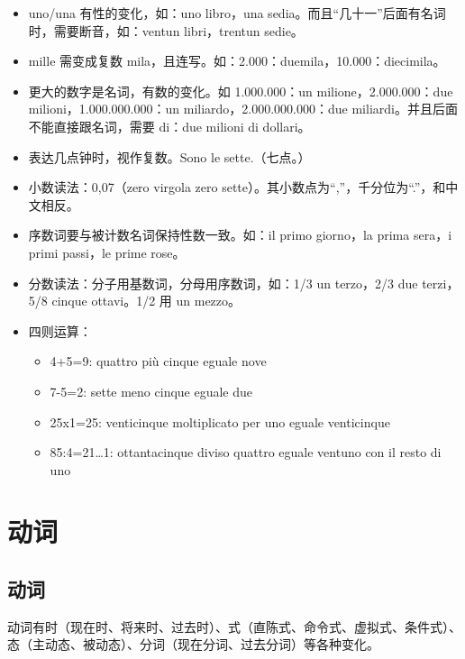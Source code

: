 \documentclass[UTF8,a4paper,titlepage,10pt]{report}
\begin{document}
\begin{enumerate}
\begin{itemize}
\item uno/una 有性的变化，如：uno libro，una sedia。而且“几十一”后面有名词时，需要断音，如：ventun libri，trentun sedie。
\item mille 需变成复数 mila，且连写。如：2.000：duemila，10.000：diecimila。
\item 更大的数字是名词，有数的变化。如 1.000.000：un milione，2.000.000：due milioni，1.000.000.000：un miliardo，2.000.000.000：due miliardi。并且后面不能直接跟名词，需要 di：due milioni di dollari。
\item 表达几点钟时，视作复数。Sono le sette.（七点。）
\item 小数读法：0,07（zero virgola zero sette）。其小数点为``,''，千分位为``.''，和中文相反。
\item 序数词要与被计数名词保持性数一致。如：il primo giorno，la prima sera，i primi passi，le prime rose。
\item 分数读法：分子用基数词，分母用序数词，如：1/3 un terzo，2/3 due terzi，5/8 cinque ottavi。1/2 用 un mezzo。
\item 四则运算：
\begin{itemize}
\item 4+5=9: quattro più cinque eguale nove
\item 7-5=2: sette meno cinque eguale due
\item 25x1=25: venticinque moltiplicato per uno eguale venticinque
\item 85:4=21\ldots{}1: ottantacinque diviso quattro eguale ventuno con il resto di uno
\end{itemize}
\end{itemize}
\end{enumerate}

\chapter{动词}
\label{sec:org50e37c4}

\section{动词}
\label{sec:orgf7ad656}

动词有时（现在时、将来时、过去时）、式（直陈式、命令式、虚拟式、条件式）、态（主动态、被动态）、分词（现在分词、过去分词）等各种变化。
\end{document}
